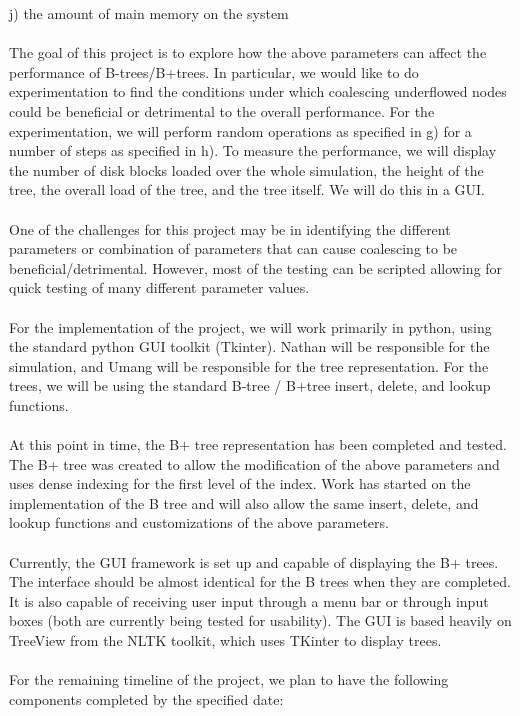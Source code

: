 \documentclass[fleqn]{article}
\begin{document}
	j) the amount of main memory on the system
\\ \\
The goal of this project is to explore how the above parameters can affect the performance of B-trees/B+trees.  In particular, we would like to do experimentation to find the conditions under which coalescing underflowed nodes could be beneficial or detrimental to the overall performance.  For the experimentation, we will perform random operations as specified in g) for a number of steps as specified in h).  To measure the performance, we will display the number of disk blocks loaded over the whole simulation, the height of the tree, the overall load of the tree, and the tree itself.  We will do this in a GUI.
\\ \\
One of the challenges for this project may be in identifying the different parameters or combination of parameters that can cause coalescing to be beneficial/detrimental.  However, most of the testing can be scripted allowing for quick testing of many different parameter values.
\\ \\
For the implementation of the project, we will work primarily in python, using the standard python GUI toolkit (Tkinter).  Nathan will be responsible for the simulation, and Umang will be responsible for the tree representation.  For the trees, we will be using the standard B-tree / B+tree insert, delete, and lookup functions.
\\ \\
At this point in time, the B+ tree representation has been completed and tested.  The B+ tree was created to allow the modification of the above parameters and uses dense indexing for the first level of the index.  Work has started on the implementation of the B tree and will also allow the same insert, delete, and lookup functions and customizations of the above parameters.
\\ \\
Currently, the GUI framework is set up and capable of displaying the B+ trees.  The interface should be almost identical for the B trees when they are completed.  It is also capable of receiving user input through a menu bar or through input boxes (both are currently being tested for usability).  The GUI is based heavily on TreeView from the NLTK toolkit, which uses TKinter to display trees.
\\ \\
For the remaining timeline of the project, we plan to have the following components completed by the specified date:
\end{document}

